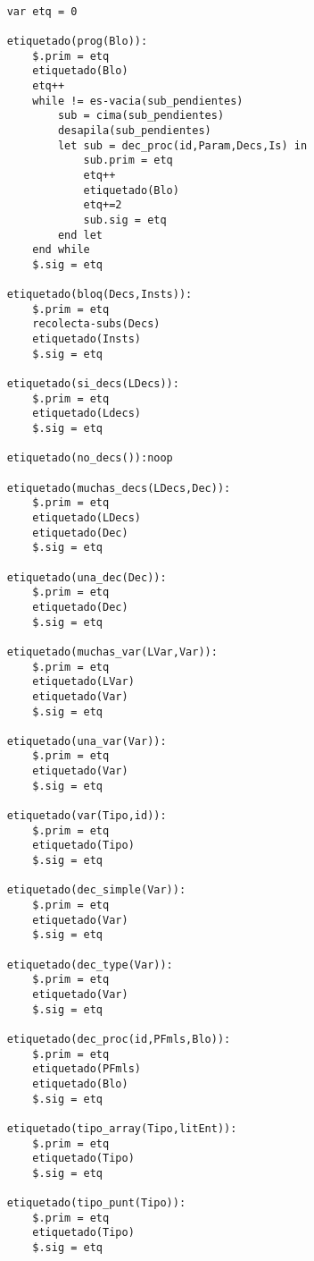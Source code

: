 \begin{lstlisting}

    var etq = 0 

    etiquetado(prog(Blo)):
        $.prim = etq
        etiquetado(Blo)
        etq++
        while != es-vacia(sub_pendientes)
            sub = cima(sub_pendientes)
            desapila(sub_pendientes)
            let sub = dec_proc(id,Param,Decs,Is) in
                sub.prim = etq
                etq++
                etiquetado(Blo)
                etq+=2
                sub.sig = etq
            end let
        end while
        $.sig = etq

    etiquetado(bloq(Decs,Insts)):
        $.prim = etq
        recolecta-subs(Decs)
        etiquetado(Insts)
        $.sig = etq
    
    etiquetado(si_decs(LDecs)):
        $.prim = etq
        etiquetado(Ldecs)
        $.sig = etq
    
    etiquetado(no_decs()):noop
    
    etiquetado(muchas_decs(LDecs,Dec)):
        $.prim = etq
        etiquetado(LDecs)
        etiquetado(Dec)
        $.sig = etq
    
    etiquetado(una_dec(Dec)):
        $.prim = etq
        etiquetado(Dec)
        $.sig = etq

    etiquetado(muchas_var(LVar,Var)):
        $.prim = etq
        etiquetado(LVar)
        etiquetado(Var)
        $.sig = etq

    etiquetado(una_var(Var)):
        $.prim = etq
        etiquetado(Var)
        $.sig = etq
    
    etiquetado(var(Tipo,id)):
        $.prim = etq
        etiquetado(Tipo)
        $.sig = etq
    
    etiquetado(dec_simple(Var)):
        $.prim = etq
        etiquetado(Var)
        $.sig = etq

    etiquetado(dec_type(Var)):
        $.prim = etq
        etiquetado(Var)
        $.sig = etq
    
    etiquetado(dec_proc(id,PFmls,Blo)):
        $.prim = etq
        etiquetado(PFmls)
        etiquetado(Blo)
        $.sig = etq

    etiquetado(tipo_array(Tipo,litEnt)):
        $.prim = etq
        etiquetado(Tipo)
        $.sig = etq

    etiquetado(tipo_punt(Tipo)):
        $.prim = etq
        etiquetado(Tipo)
        $.sig = etq


\end{lstlisting}
